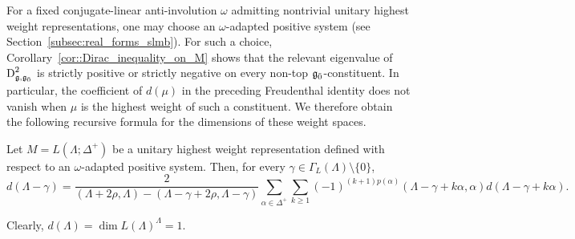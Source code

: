 For a fixed conjugate-linear anti-involution $\omega$ admitting nontrivial unitary highest weight representations, one may choose an $\omega$-adapted positive system (see Section~\ref{subsec:real_forms_slmb}). For such a choice, Corollary~\ref{cor::Dirac_inequality_on_M} shows that the relevant eigenvalue of $\operatorname{D}_{{\mathfrak{g}},{\mathfrak{g}_{\bar{0}}}}^{2}$ is strictly positive or strictly negative on every non-top ${\mathfrak{g}_{\bar{0}}}$-constituent. In particular, the coefficient of $d(\mu)$ in the preceding Freudenthal identity does not vanish when $\mu$ is the highest weight of such a constituent. We therefore obtain the following recursive formula for the dimensions of these weight spaces.

\begin{corollary}
Let $M=L(\Lambda;\Delta^{+})$ be a unitary highest weight representation defined with respect to an $\omega$-adapted positive system. Then, for every $\gamma\in\Gamma_{L}(\Lambda)\setminus\{0\}$,
\begin{equation*}
d(\Lambda-\gamma)
=
\frac{2}{
(\Lambda+2\rho,\Lambda)
-
(\Lambda-\gamma+2\rho,\Lambda-\gamma)
}
\sum_{\alpha\in\Delta^{+}}\sum_{k\geq1}
(-1)^{(k+1)p(\alpha)}
(\Lambda-\gamma+k\alpha,\alpha)
d(\Lambda-\gamma+k\alpha).
\end{equation*}
\end{corollary}

\begin{remark}
Clearly, $d(\Lambda)=\dim L(\Lambda)^{\Lambda}=1$.
\end{remark}

